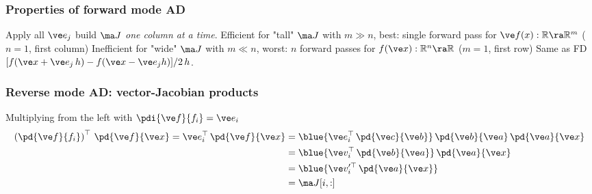 \documentclass[fleqn,10pt]{beamer}
\begin{document}
\begin{frame}
    \frametitle{Properties of forward mode AD}
    Apply all $\ve e_j$ \ra build $\ma J$ \emph{one column at a time}.
    Efficient for "tall" $\ma J$ with $m\gg n$, best: single forward pass for $\ve f(x): \mathbb R \ra \mathbb R^m$ ($n=1$, first column)
    \edgecol
    Inefficient for "wide" $\ma J$ with $m\ll n$, worst: $n$ forward passes for $f(\ve x): \mathbb R^n \ra \mathbb R$ ($m=1$, first row)
    \edgerow
    Same as FD $[f(\ve x +\ve e_j\,h) - f(\ve x-\ve e_j h)]/2\,h$.
\end{frame}

\begin{frame}
    \frametitle{Reverse mode AD: vector-Jacobian products}
    Multiplying from the left with $\pdi{\ve f}{f_i} = \ve e_i$
    \begin{align*}
        \left(\pd{\ve f}{f_i}\right)^\top\,\pd{\ve f}{\ve x} = \ve e_i^\top\,\pd{\ve f}{\ve x}
            &= \blue{\ve e_i^\top\,\pd{\ve c}{\ve b}}\,\pd{\ve b}{\ve a}\,\pd{\ve a}{\ve x}\\
            &= \blue{\ve v_i^\top\,\pd{\ve b}{\ve a}}\,\pd{\ve a}{\ve x}\\
            &= \blue{\ve v_i'^\top\,\pd{\ve a}{\ve x}}\\
            &= \ma J[i,:]
    \end{align*}
\end{frame}
\end{document}
